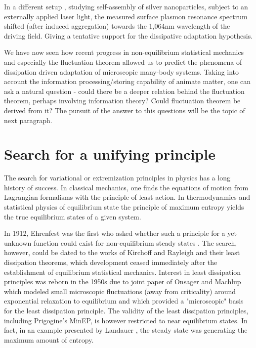 \documentclass[a4paper,12pt]{article}
\begin{document}
In a different setup \cite{Ito:2013fh}, studying self-assembly of silver nanoparticles, subject to an externally applied laser light, the measured surface plasmon resonance spectrum shifted (after induced aggregation) towards the 1,064nm wavelength of the driving field. Giving a tentative support for the dissipative adaptation hypothesis.

\cite{Carnall:2010ju}

We have now seen how recent progress in non-equilibrium statistical mechanics and especially the fluctuation theorem allowed us to predict the phenomena of dissipation driven adaptation of microscopic many-body systems.
Taking into account the information processing/storing capability of animate matter, one can ask a natural question - could there be a deeper relation behind the fluctuation theorem, perhaps involving information theory? Could fluctuation theorem be derived from it?
The pursuit of the answer to this questions will be the topic of next paragraph.

\section{Search for a unifying principle}
\label{UnifyingPrinciple}
The search for variational or extremization principles in physics has a long history of success. In classical mechanics, one finds the equations of motion from Lagrangian formalisms with the principle of least action. In thermodynamics and statistical physics of equilibrium state the principle of maximum entropy yields the true equilibrium states of a given system. 

In 1912, Ehrenfest was the first who asked whether such a principle for a yet unknown function could exist for non-equilibrium steady states \cite{Dewar:2014ek}.
The search, however, could be dated to the works of Kirchoff and Rayleigh and their least dissipation theorems, which development ceased immediately after the establishment of equilibrium statistical mechanics.
Interest in least dissipation principles was reborn in the 1950s due to joint paper of Onsager and Machlup \cite{Onsager:3UFhYpWV} which modeled small microscopic fluctuations (away from criticality) around exponential relaxation to equilibrium and which provided a "microscopic" basis for the least dissipation principle. The validity of the least dissipation principles, including Prigogine's MinEP, is however restricted to near equilibrium states. In fact, in an example presented by Landauer \cite{Landauer:pJ4RYJRG}, the steady state was generating the maximum amount of entropy.
\end{document}
